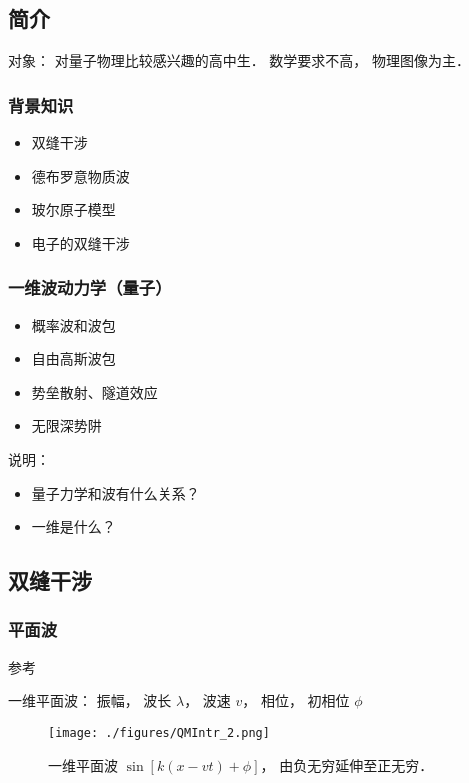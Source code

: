 
\subsection{简介}
对象： 对量子物理比较感兴趣的高中生． 数学要求不高， 物理图像为主．

\subsubsection{背景知识}
\begin{itemize}
\item 双缝干涉
\item 德布罗意物质波
\item 玻尔原子模型
\item 电子的双缝干涉
\end{itemize}

\subsubsection{一维波动力学（量子）}
\begin{itemize}
\item 概率波和波包
\item 自由高斯波包
\item 势垒散射、隧道效应
\item 无限深势阱
\end{itemize}

说明：
\begin{itemize}
\item 量子力学和波有什么关系？
\item 一维是什么？
\end{itemize}

\subsection{双缝干涉}

\subsubsection{平面波}

参考

一维平面波： 振幅， 波长 $\lambda$， 波速 $v$， 相位， 初相位 $\phi$
\begin{figure}[ht]
\centering
\texttt{[image: ./figures/QMIntr\_2.png]}
\caption{一维平面波 $\sin[k(x-vt) + \phi]$， 由负无穷延伸至正无穷．} \label{QMIntr_fig2}
\end{figure}

